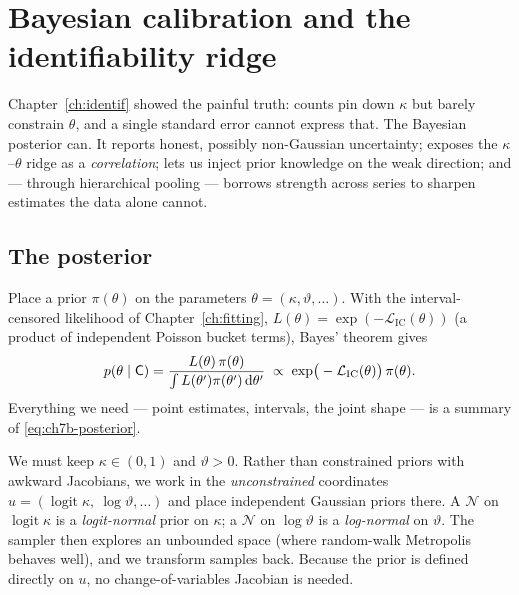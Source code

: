\chapter{Bayesian calibration and the identifiability ridge}
\label{ch:bayes}

\begin{motivation}
Chapter~\ref{ch:identif} showed the painful truth: counts pin down $\kappa$ but
barely constrain $\theta$, and a single standard error cannot express that. The
Bayesian posterior can. It reports honest, possibly non-Gaussian uncertainty;
exposes the $\kappa$--$\theta$ ridge as a \emph{correlation}; lets us inject prior
knowledge on the weak direction; and --- through hierarchical pooling --- borrows
strength across series to sharpen estimates the data alone cannot.
\end{motivation}

\section{The posterior}

Place a prior $\pi(\theta)$ on the parameters $\theta=(\kappa,\vartheta,\dots)$.
With the interval-censored likelihood of Chapter~\ref{ch:fitting},
$L(\theta)=\exp(-\mathcal L_{\mathrm{IC}}(\theta))$ (a product of independent
Poisson bucket terms), Bayes' theorem gives
\begin{equation}
p(\theta\mid\mathsf{C})=\frac{L(\theta)\,\pi(\theta)}{\int L(\theta')\pi(\theta')\,\mathrm{d}\theta'}
\;\propto\;\exp\!\big(-\mathcal L_{\mathrm{IC}}(\theta)\big)\,\pi(\theta).
\label{eq:ch7b-posterior}
\end{equation}
Everything we need --- point estimates, intervals, the joint shape --- is a summary
of \eqref{eq:ch7b-posterior}.

\begin{whybox}
We must keep $\kappa\in(0,1)$ and $\vartheta>0$. Rather than constrained priors with
awkward Jacobians, we work in the \emph{unconstrained} coordinates
$u=(\operatorname{logit}\kappa,\ \log\vartheta,\dots)$ and place independent
Gaussian priors there. A $\mathcal N$ on $\operatorname{logit}\kappa$ is a
\emph{logit-normal} prior on $\kappa$; a $\mathcal N$ on $\log\vartheta$ is a
\emph{log-normal} on $\vartheta$. The sampler then explores an unbounded space (where
random-walk Metropolis behaves well), and we transform samples back. Because the
prior is defined directly on $u$, no change-of-variables Jacobian is needed.
\end{whybox}

